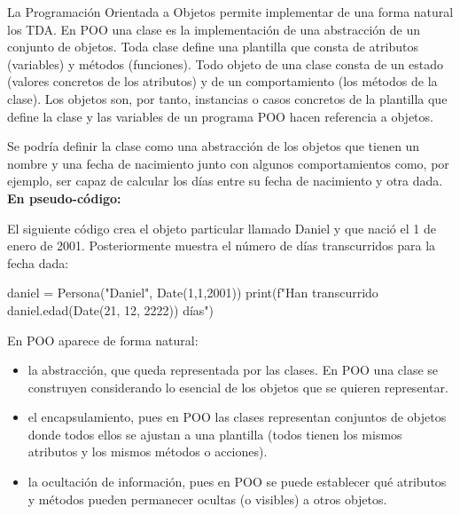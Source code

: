 La Programación Orientada a Objetos permite implementar de una forma natural los TDA. En POO una clase es la implementación de una abstracción de un conjunto de objetos. Toda clase define una plantilla que consta de atributos (variables) y métodos (funciones). Todo objeto de una clase consta de un estado (valores concretos de los atributos) y de un comportamiento (los métodos de la clase). Los objetos son, por tanto, instancias o casos concretos de la plantilla que define la clase y las variables de un programa POO hacen referencia a objetos. 

\begin{ejemplo}
Se podría definir la clase  como una abstracción de los objetos que tienen un nombre y una fecha de nacimiento junto con algunos comportamientos como, por ejemplo, ser capaz de calcular los días entre su fecha de nacimiento y otra dada. \textbf{En pseudo-código:}
\begin{pyverbatim}
class Persona {
   String nombre;
   Date fechaNacimiento;

   int edad(Date fecha) {
      return abs(fecha.toInt() - fechaNacimiento.toInt());
   ...
} 
\end{pyverbatim}

El siguiente código crea el objeto particular llamado Daniel y que nació el 1 de enero de 2001. Posteriormente muestra el número de días transcurridos para la fecha dada:

\begin{pyverbatim}
daniel = Persona("Daniel", Date(1,1,2001))
print(f"Han transcurrido {daniel.edad(Date(21, 12, 2222))} días")
\end{pyverbatim}
\end{ejemplo}



\noindent En POO aparece de forma natural:
\begin{itemize}
\item la abstracción, que queda representada por las clases. En POO una clase se construyen considerando lo esencial de los objetos que se quieren representar. 

\item el encapsulamiento, pues en POO las clases representan conjuntos de objetos donde todos ellos se ajustan a una plantilla (todos tienen los mismos atributos y los mismos métodos o acciones).

\item la ocultación de información, pues en POO se puede establecer qué atributos y métodos pueden permanecer ocultas (o visibles) a otros objetos.
\end{itemize}

